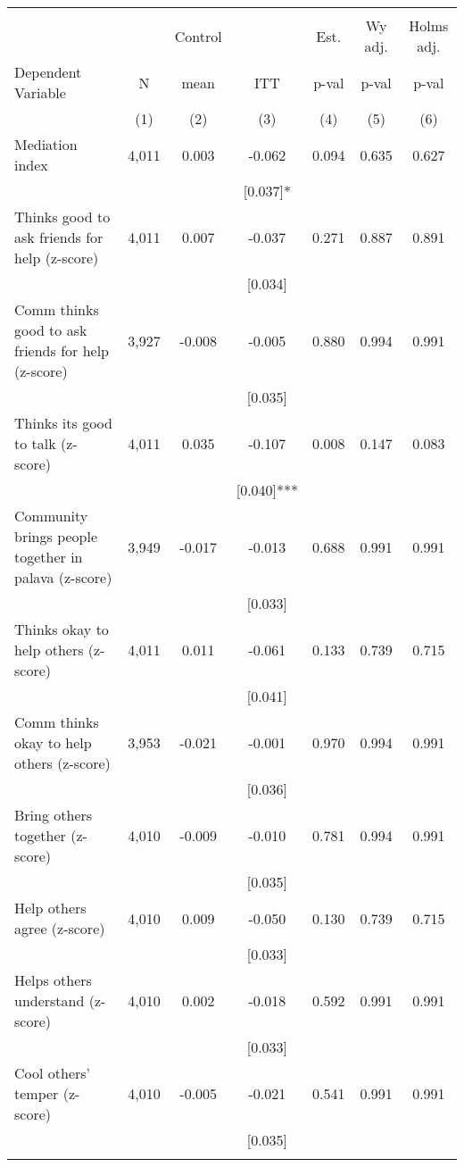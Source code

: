 \begin{tabular}{lcccccc}
\hline \noalign{\smallskip} &  &  &  &  &  & \\
 &  & Control &  & Est. & Wy adj. & Holms adj.\\
Dependent Variable & N & mean & ITT & p-val & p-val & p-val\\
 & (1) & (2) & (3) & (4) & (5) & (6)\\
\noalign{\smallskip}\hline \noalign{\smallskip}Mediation index & 4,011 & 0.003 & -0.062 & 0.094 & 0.635 & 0.627\\
 &  &  & [0.037]* &  &  & \\
\quad Thinks good to ask friends for help (z-score) & 4,011 & 0.007 & -0.037 & 0.271 & 0.887 & 0.891\\
 &  &  & [0.034] &  &  & \\
\quad Comm thinks good to ask friends for help (z-score) & 3,927 & -0.008 & -0.005 & 0.880 & 0.994 & 0.991\\
 &  &  & [0.035] &  &  & \\
\quad Thinks its good to talk (z-score) & 4,011 & 0.035 & -0.107 & 0.008 & 0.147 & 0.083\\
 &  &  & [0.040]*** &  &  & \\
\quad Community brings people together in palava (z-score) & 3,949 & -0.017 & -0.013 & 0.688 & 0.991 & 0.991\\
 &  &  & [0.033] &  &  & \\
\quad Thinks okay to help others (z-score) & 4,011 & 0.011 & -0.061 & 0.133 & 0.739 & 0.715\\
 &  &  & [0.041] &  &  & \\
\quad Comm thinks okay to help others (z-score) & 3,953 & -0.021 & -0.001 & 0.970 & 0.994 & 0.991\\
 &  &  & [0.036] &  &  & \\
\quad Bring others together (z-score) & 4,010 & -0.009 & -0.010 & 0.781 & 0.994 & 0.991\\
 &  &  & [0.035] &  &  & \\
\quad Help others agree (z-score) & 4,010 & 0.009 & -0.050 & 0.130 & 0.739 & 0.715\\
 &  &  & [0.033] &  &  & \\
\quad Helps others understand (z-score) & 4,010 & 0.002 & -0.018 & 0.592 & 0.991 & 0.991\\
 &  &  & [0.033] &  &  & \\
\quad Cool others' temper (z-score) & 4,010 & -0.005 & -0.021 & 0.541 & 0.991 & 0.991\\
 &  &  & [0.035] &  &  & \\
\noalign{\smallskip}\hline\end{tabular}
